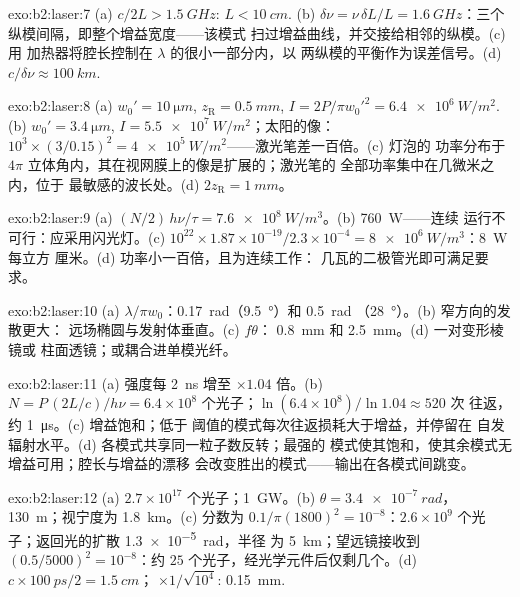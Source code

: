 \begin{solution}{exo:b2:laser:7}
(a) $c/2L > \qty{1.5}{GHz}$: $L < \qty{10}{cm}$. (b) $\delta\nu = \nu\,\delta L/L
= \qty{1.6}{GHz}$：三个纵模间隔，即整个增益宽度——该模式
扫过增益曲线，并交接给相邻的纵模。(c) 用
加热器将腔长控制在 $\lambda$ 的很小一部分内，以
两纵模的平衡作为误差信号。(d) $c/\delta\nu \approx
\qty{100}{km}$.
\end{solution}

\begin{solution}{exo:b2:laser:8}
(a) $w_0' = \qty{10}{\micro m}$, $z_{\text{R}} = \qty{0.5}{mm}$, $I = 2P/\pi
w_0'^2 = \qty{6.4e6}{W/m^2}$. (b) $w_0' = \qty{3.4}{\micro m}$, $I =
\qty{5.5e7}{W/m^2}$；太阳的像：$10^3 \times (3/0.15)^2 =
\qty{4e5}{W/m^2}$——激光笔差一百倍。(c) 灯泡的
功率分布于 $4\pi$ 立体角内，其在视网膜上的像是扩展的；激光笔的
全部功率集中在几微米之内，位于
最敏感的波长处。(d) $2z_{\text{R}} = \qty{1}{mm}$。
\end{solution}

\begin{solution}{exo:b2:laser:9}
(a) $(N/2)\,h\nu/\tau = \qty{7.6e8}{W/m^3}$。(b) \qty{760}{W}——连续
运行不可行：应采用闪光灯。(c) $10^{22} \times 1.87 \times
10^{-19}/2.3 \times 10^{-4} = \qty{8e6}{W/m^3}$：\qty{8}{W} 每立方
厘米。(d) 功率小一百倍，且为连续工作：
几瓦的二极管光即可满足要求。
\end{solution}

\begin{solution}{exo:b2:laser:10}
(a) $\lambda/\pi w_0$：\qty{0.17}{rad}（\qty{9.5}{\degree}）和 \qty{0.5}{rad}
（\qty{28}{\degree}）。(b) 窄方向的发散更大：
远场椭圆与发射体垂直。(c) $f\theta$：
\qty{0.8}{mm} 和 \qty{2.5}{mm}。(d) 一对变形棱镜或
柱面透镜；或耦合进单模光纤。
\end{solution}

\begin{solution}{exo:b2:laser:11}
(a) 强度每 \qty{2}{ns} 增至 $\times 1.04$ 倍。(b) $N = P\,(2L/c)/h\nu =
6.4 \times 10^8$ 个光子；$\ln(6.4 \times 10^8)/\ln 1.04 \approx 520$ 次
往返，约 \qty{1}{\micro s}。(c) 增益饱和；低于
阈值的模式每次往返损耗大于增益，并停留在
自发辐射水平。(d) 各模式共享同一粒子数反转；最强的
模式使其饱和，使其余模式无增益可用；腔长与增益的漂移
会改变胜出的模式——输出在各模式间跳变。
\end{solution}

\begin{solution}{exo:b2:laser:12}
(a) $2.7 \times 10^{17}$ 个光子；\qty{1}{GW}。(b) $\theta = \qty{3.4e-7}{rad}$，
\qty{130}{m}；视宁度为 \qty{1.8}{km}。(c) 分数为 $0.1/\pi(1800)^2 =
10^{-8}$：$2.6 \times 10^9$ 个光子；返回光的扩散 \qty{1.3e-5}{rad}，半径
为 \qty{5}{km}；望远镜接收到 $(0.5/5000)^2 = 10^{-8}$：约 $25$
个光子，经光学元件后仅剩几个。(d) $c \times \qty{100}{ps}/2 = \qty{1.5}{cm}$；
$\times 1/\sqrt{10^4}$: \qty{0.15}{mm}.
\end{solution}

